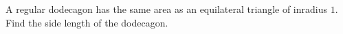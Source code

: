 A regular dodecagon has the same area as an equilateral triangle of inradius $1$. Find the side length of the dodecagon.

